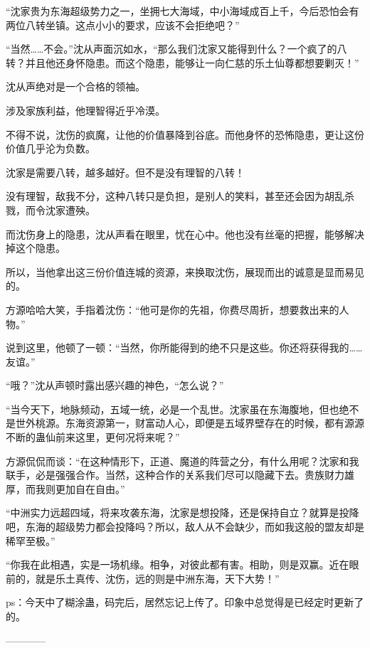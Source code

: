 \begin{this_body}
“沈家贵为东海超级势力之一，坐拥七大海域，中小海域成百上千，今后恐怕会有两位八转坐镇。这点小小的要求，应该不会拒绝吧？”

“当然……不会。”沈从声面沉如水，“那么我们沈家又能得到什么？一个疯了的八转？并且他还身怀隐患。而这个隐患，能够让一向仁慈的乐土仙尊都想要剿灭！”

沈从声绝对是一个合格的领袖。

涉及家族利益，他理智得近乎冷漠。

不得不说，沈伤的疯魔，让他的价值暴降到谷底。而他身怀的恐怖隐患，更让这份价值几乎沦为负数。

沈家是需要八转，越多越好。但不是没有理智的八转！

没有理智，敌我不分，这种八转只是负担，是别人的笑料，甚至还会因为胡乱杀戮，而令沈家遭殃。

而沈伤身上的隐患，沈从声看在眼里，忧在心中。他也没有丝毫的把握，能够解决掉这个隐患。

所以，当他拿出这三份价值连城的资源，来换取沈伤，展现而出的诚意是显而易见的。

方源哈哈大笑，手指着沈伤：“他可是你的先祖，你费尽周折，想要救出来的人物。”

说到这里，他顿了一顿：“当然，你所能得到的绝不只是这些。你还将获得我的……友谊。”

“哦？”沈从声顿时露出感兴趣的神色，“怎么说？”

“当今天下，地脉频动，五域一统，必是一个乱世。沈家虽在东海腹地，但也绝不是世外桃源。东海资源第一，财富动人心，即便是五域界壁存在的时候，都有源源不断的蛊仙前来这里，更何况将来呢？”

方源侃侃而谈：“在这种情形下，正道、魔道的阵营之分，有什么用呢？沈家和我联手，必是强强合作。当然，这种合作的关系我们尽可以隐藏下去。贵族财力雄厚，而我则更加自在自由。”

“中洲实力远超四域，将来攻袭东海，沈家是想投降，还是保持自立？就算是投降吧，东海的超级势力都会投降吗？所以，敌人从不会缺少，而如我这般的盟友却是稀罕至极。”

“你我在此相遇，实是一场机缘。相争，对彼此都有害。相助，则是双赢。近在眼前的，就是乐土真传、沈伤，远的则是中洲东海，天下大势！”

ps：今天中了糊涂蛊，码完后，居然忘记上传了。印象中总觉得是已经定时更新了的。

------------

\end{this_body}

